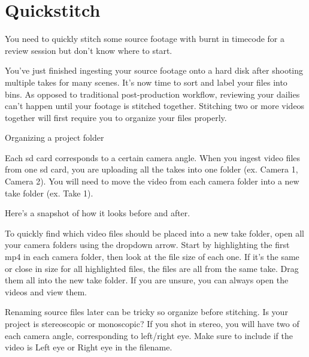 \chapter{Quickstitch}
\pagecolor{white}
\label{chap:29}
\begin{fullwidth}

\problem

{\large You need to quickly stitch some source footage with burnt in timecode for a review session but don't know where to start. \par}

You've just finished ingesting your source footage onto a hard disk after shooting multiple takes for many scenes. It's now time to sort and label your files into bins. As opposed to traditional post-production workflow, reviewing your dailies can't happen until your footage is stitched together. Stitching two or more videos together will first require you to organize your files properly.

\solution

{\large Organizing a project folder \par}

Each sd card corresponds to a certain camera angle. When you ingest video files from one sd card, you are uploading all the takes into one folder (ex. Camera 1, Camera 2). You will need to move the video from each camera folder into a new take folder (ex. Take 1).

Here's a snapshot of how it looks before and after.



To quickly find which video files should be placed into a new take folder, open all your camera folders using the dropdown arrow. Start by highlighting the first mp4 in each camera folder, then look at the file size of each one. If it's the same or close in size for all highlighted files, the files are all from the same take. Drag them all into the new take folder. If you are unsure, you can always open the videos and view them.





Renaming source files later can be tricky so organize before stitching. Is your project is stereoscopic or monoscopic? If you shot in stereo, you will have two of each camera angle, corresponding to left/right eye. Make sure to include if the video is Left eye or Right eye in the filename.


\end{fullwidth}
